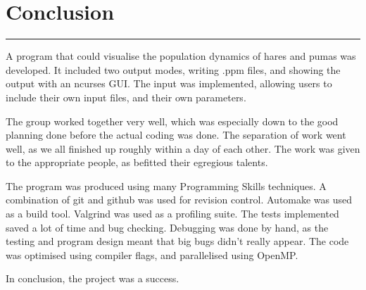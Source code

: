 \section{Conclusion}
\vspace{-2em}\rule{\textwidth}{1pt}\vspace{1em}

A program that could visualise the population dynamics of hares and pumas was developed.
It included two output modes, writing .ppm files, and showing the output with an ncurses GUI.
The input was implemented, allowing users to include their own input files, and their own parameters.

The group worked together very well, which was especially down to the good planning done before the actual coding was done.
The separation of work went well, as we all finished up roughly within a day of each other.
The work was given to the appropriate people, as befitted their egregious talents.

The program was produced using many Programming Skills techniques.
A combination of git and github was used for revision control.
Automake was used as a build tool.
Valgrind was used as a profiling suite.
The tests implemented saved a lot of time and bug checking.
Debugging was done by hand, as the testing and program design meant that big bugs didn't really appear.
The code was optimised using compiler flags, and parallelised using OpenMP.

In conclusion, the project was a success.

